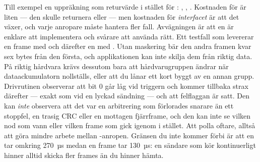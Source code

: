  Till exempel en uppräkning som returvärde i stället för : ,
, . Kostnaden för  är liten --- den skulle returnera
 eller  --- men kostnaden för \emph{interfacet} är att det växer, och
varje anropare måste hantera fler fall. Avvägningen är att en  är enklare att
implementera och svårare att använda rätt.
 Ett testfall som levererar en frame med  och därefter en med .
Utan maskering bär den andra framen kvar sex bytes från den första, och applikationen kan inte
skilja dem från riktig data. På riktig hårdvara krävs dessutom bara att hårdvarugruppen ändrar
när dataackumulatorn nollställs, eller att du lånar ett kort byggt av en annan grupp.
 Drivrutinen observerar att  bit 0 går låg vid triggern och kommer tillbaka
strax därefter --- exakt som vid en lyckad sändning --- och att felflaggan är satt. Den kan
\emph{inte} observera att det var en arbitrering som förlorades snarare än ett stoppfel, en
trasig CRC eller en mottagen fjärrframe, och den kan inte se vilken nod som vann eller vilken
frame som gick igenom i stället.
 Att polla oftare, alltså att göra mindre arbete mellan -anropen. Gränsen
du inte kommer förbi är att en  tar omkring 270~µs medan en frame tar 130~µs: en
sändare som kör kontinuerligt hinner alltid skicka fler frames än du hinner hämta.
